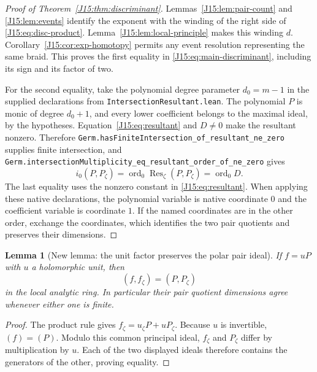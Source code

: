 \documentclass[11pt,oneside]{report}
\newtheorem{lemma}[theorem]{Lemma}
\theoremstyle{definition}
\numberwithin{equation}{section}
\newcommand{\decl}[1]{\textnormal{\nolinkurl{#1}}}
\newcommand{\ord}{\operatorname{ord}}
\newcommand{\Res}{\operatorname{Res}}
\begin{document}
\begin{proof}[Proof of Theorem~\ref{J15:thm:discriminant}]
Lemmas~\ref{J15:lem:pair-count} and \ref{J15:lem:events} identify the exponent
with the winding of the right side of \eqref{J15:eq:disc-product}.
Lemma~\ref{J15:lem:local-principle} makes this winding $d$.
Corollary~\ref{J15:cor:exp-homotopy} permits any event resolution representing
the same braid. This proves the first equality in
\eqref{J15:eq:main-discriminant}, including its sign and its factor of two.

For the second equality, take the polynomial degree parameter $d_0=m-1$
in the supplied declarations from \decl{IntersectionResultant.lean}.
The polynomial $P$ is monic of degree $d_0+1$, and every lower coefficient
belongs to the maximal ideal, by the hypotheses. Equation~\eqref{J15:eq:resultant}
and $D\ne0$ make the resultant nonzero. Therefore
\decl{Germ.hasFiniteIntersection_of_resultant_ne_zero} supplies finite
intersection, and
\decl{Germ.intersectionMultiplicity_eq_resultant_order_of_ne_zero}
gives
\[
 i_0(P,P_\zeta)=\ord_0\Res_\zeta(P,P_\zeta)=\ord_0 D.
\]
The last equality uses the nonzero constant in \eqref{J15:eq:resultant}.
When applying these native declarations, the polynomial variable is native
coordinate $0$ and the coefficient variable is coordinate $1$.
If the named coordinates are in the other order, exchange the coordinates,
which identifies the two pair quotients and preserves their dimensions.
\end{proof}

\begin{lemma}[New lemma: the unit factor preserves the polar pair ideal]
\label{J15:lem:unit}
If $f=uP$ with $u$ a holomorphic unit, then
\[
 (f,f_\zeta)=(P,P_\zeta)
\]
in the local analytic ring. In particular their pair quotient dimensions
agree whenever either one is finite.
\end{lemma}

\begin{proof}
The product rule gives $f_\zeta=u_\zeta P+uP_\zeta$.
Because $u$ is invertible, $(f)=(P)$. Modulo this common principal ideal,
$f_\zeta$ and $P_\zeta$ differ by multiplication by $u$.
Each of the two displayed ideals therefore contains the generators of the
other, proving equality.
\end{proof}
\end{document}
